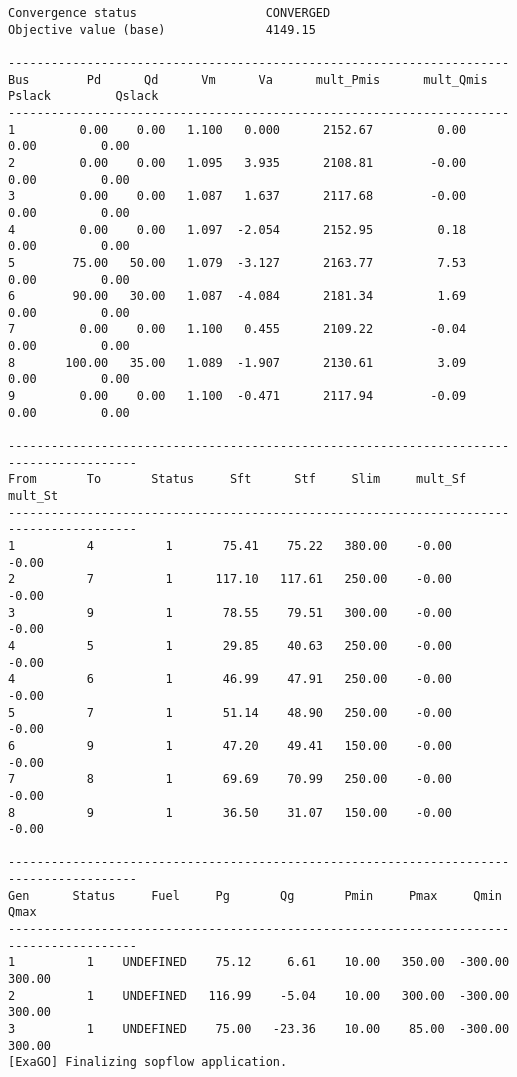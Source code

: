 \begin{lstlisting}
Convergence status                  CONVERGED
Objective value (base)              4149.15

----------------------------------------------------------------------
Bus        Pd      Qd      Vm      Va      mult_Pmis      mult_Qmis      Pslack         Qslack        
----------------------------------------------------------------------
1         0.00    0.00   1.100   0.000      2152.67         0.00         0.00         0.00
2         0.00    0.00   1.095   3.935      2108.81        -0.00         0.00         0.00
3         0.00    0.00   1.087   1.637      2117.68        -0.00         0.00         0.00
4         0.00    0.00   1.097  -2.054      2152.95         0.18         0.00         0.00
5        75.00   50.00   1.079  -3.127      2163.77         7.53         0.00         0.00
6        90.00   30.00   1.087  -4.084      2181.34         1.69         0.00         0.00
7         0.00    0.00   1.100   0.455      2109.22        -0.04         0.00         0.00
8       100.00   35.00   1.089  -1.907      2130.61         3.09         0.00         0.00
9         0.00    0.00   1.100  -0.471      2117.94        -0.09         0.00         0.00

----------------------------------------------------------------------------------------
From       To       Status     Sft      Stf     Slim     mult_Sf  mult_St 
----------------------------------------------------------------------------------------
1          4          1       75.41    75.22   380.00    -0.00    -0.00
2          7          1      117.10   117.61   250.00    -0.00    -0.00
3          9          1       78.55    79.51   300.00    -0.00    -0.00
4          5          1       29.85    40.63   250.00    -0.00    -0.00
4          6          1       46.99    47.91   250.00    -0.00    -0.00
5          7          1       51.14    48.90   250.00    -0.00    -0.00
6          9          1       47.20    49.41   150.00    -0.00    -0.00
7          8          1       69.69    70.99   250.00    -0.00    -0.00
8          9          1       36.50    31.07   150.00    -0.00    -0.00

----------------------------------------------------------------------------------------
Gen      Status     Fuel     Pg       Qg       Pmin     Pmax     Qmin     Qmax  
----------------------------------------------------------------------------------------
1          1    UNDEFINED    75.12     6.61    10.00   350.00  -300.00   300.00
2          1    UNDEFINED   116.99    -5.04    10.00   300.00  -300.00   300.00
3          1    UNDEFINED    75.00   -23.36    10.00    85.00  -300.00   300.00
[ExaGO] Finalizing sopflow application.
\end{lstlisting}
